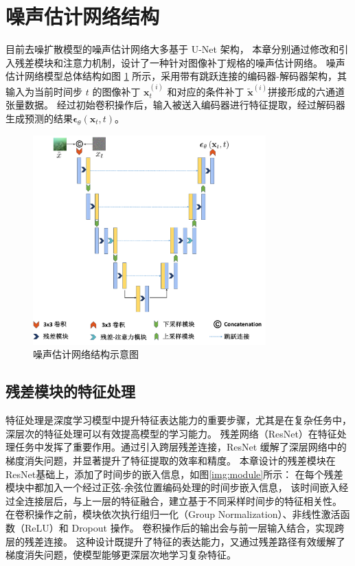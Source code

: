 \section{噪声估计网络结构}
目前去噪扩散模型的噪声估计网络大多基于 U-Net \cite{unet}架构，
本章分别通过修改和引入残差模块和注意力机制，设计了一种针对图像补丁规格的噪声估计网络。
噪声估计网络模型总体结构如图 \ref{img:network} 所示，采用带有跳跃连接的编码器-解码器架构，其输入为当前时间步 $t$ 的图像补丁 $\mathbf{x}^{(i)}_t$ 和对应的条件补丁 $\tilde{\mathbf{x}}^{(i)}$拼接形成的六通道张量数据。
经过初始卷积操作后，输入被送入编码器进行特征提取，经过解码器生成预测的结果$\boldsymbol{\epsilon}_\theta(\mathbf{x}_t, t)$。
\begin{figure}
    \centering 
    \includegraphics[width=0.8\textwidth]{figures/ch3/network.pdf}
    \caption{噪声估计网络结构示意图}
    \label{img:network}
\end{figure}

\subsection{残差模块的特征处理}
特征处理是深度学习模型中提升特征表达能力的重要步骤，尤其是在复杂任务中，深层次的特征处理可以有效提高模型的学习能力。
残差网络（ResNet）\cite{resnet}在特征处理任务中发挥了重要作用。通过引入跨层残差连接，ResNet 缓解了深层网络中的梯度消失问题，并显著提升了特征提取的效率和精度。
本章设计的残差模块在ResNet基础上，添加了时间步的嵌入信息，如图\ref{img:module}所示：
在每个残差模块中都加入一个经过正弦-余弦位置编码处理的时间步嵌入信息，
该时间嵌入经过全连接层后，与上一层的特征融合，建立基于不同采样时间步的特征相关性。
在卷积操作之前，模块依次执行组归一化（Group Normalization）、非线性激活函数（ReLU）和 Dropout 操作。
卷积操作后的输出会与前一层输入结合，实现跨层的残差连接。
这种设计既提升了特征的表达能力，又通过残差路径有效缓解了梯度消失问题，使模型能够更深层次地学习复杂特征。

